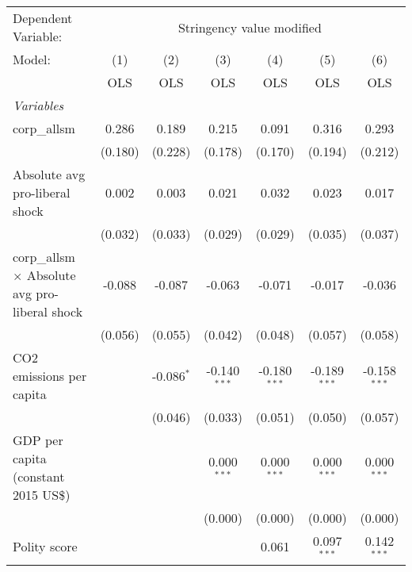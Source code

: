 
\begingroup
\centering
\begin{tabular}{lcccccc}
   \toprule
   Dependent Variable: & \multicolumn{6}{c}{Stringency value modified}\\
   Model:                                                & (1)     & (2)          & (3)            & (4)            & (5)            & (6)\\  
                                                         &  OLS    & OLS          & OLS            & OLS            & OLS            & OLS\\  
   \midrule
   \emph{Variables}\\
   corp\_allsm                                           & 0.286   & 0.189        & 0.215          & 0.091          & 0.316          & 0.293\\   
                                                         & (0.180) & (0.228)      & (0.178)        & (0.170)        & (0.194)        & (0.212)\\   
   Absolute avg pro-liberal shock                        & 0.002   & 0.003        & 0.021          & 0.032          & 0.023          & 0.017\\   
                                                         & (0.032) & (0.033)      & (0.029)        & (0.029)        & (0.035)        & (0.037)\\   
   corp\_allsm $\times$ Absolute avg pro-liberal shock   & -0.088  & -0.087       & -0.063         & -0.071         & -0.017         & -0.036\\   
                                                         & (0.056) & (0.055)      & (0.042)        & (0.048)        & (0.057)        & (0.058)\\   
   CO2 emissions per capita                              &         & -0.086$^{*}$ & -0.140$^{***}$ & -0.180$^{***}$ & -0.189$^{***}$ & -0.158$^{***}$\\   
                                                         &         & (0.046)      & (0.033)        & (0.051)        & (0.050)        & (0.057)\\   
   GDP per capita (constant 2015 US\$)                   &         &              & 0.000$^{***}$  & 0.000$^{***}$  & 0.000$^{***}$  & 0.000$^{***}$\\   
                                                         &         &              & (0.000)        & (0.000)        & (0.000)        & (0.000)\\   
   Polity score                                          &         &              &                & 0.061          & 0.097$^{***}$  & 0.142$^{***}$\\   

\end{tabular}
